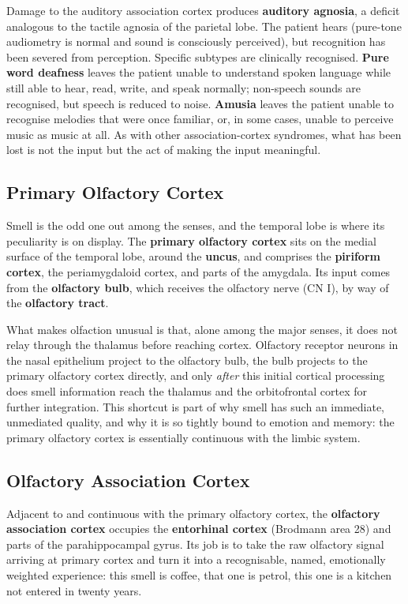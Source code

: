\documentclass[11pt]{article}
\begin{document}
Damage to the auditory association cortex produces \textbf{auditory agnosia}, a deficit analogous to the tactile agnosia of the parietal lobe. The patient hears (pure-tone audiometry is normal and sound is consciously perceived), but recognition has been severed from perception. Specific subtypes are clinically recognised. \textbf{Pure word deafness} leaves the patient unable to understand spoken language while still able to hear, read, write, and speak normally; non-speech sounds are recognised, but speech is reduced to noise. \textbf{Amusia} leaves the patient unable to recognise melodies that were once familiar, or, in some cases, unable to perceive music as music at all. As with other association-cortex syndromes, what has been lost is not the input but the act of making the input meaningful.

\subsection{Primary Olfactory Cortex}

Smell is the odd one out among the senses, and the temporal lobe is where its peculiarity is on display. The \textbf{primary olfactory cortex} sits on the medial surface of the temporal lobe, around the \textbf{uncus}, and comprises the \textbf{piriform cortex}, the periamygdaloid cortex, and parts of the amygdala. Its input comes from the \textbf{olfactory bulb}, which receives the olfactory nerve (CN I), by way of the \textbf{olfactory tract}.

What makes olfaction unusual is that, alone among the major senses, it does not relay through the thalamus before reaching cortex. Olfactory receptor neurons in the nasal epithelium project to the olfactory bulb, the bulb projects to the primary olfactory cortex directly, and only \textit{after} this initial cortical processing does smell information reach the thalamus and the orbitofrontal cortex for further integration. This shortcut is part of why smell has such an immediate, unmediated quality, and why it is so tightly bound to emotion and memory: the primary olfactory cortex is essentially continuous with the limbic system.

\subsection{Olfactory Association Cortex}

Adjacent to and continuous with the primary olfactory cortex, the \textbf{olfactory association cortex} occupies the \textbf{entorhinal cortex} (Brodmann area 28) and parts of the parahippocampal gyrus. Its job is to take the raw olfactory signal arriving at primary cortex and turn it into a recognisable, named, emotionally weighted experience: this smell is coffee, that one is petrol, this one is a kitchen not entered in twenty years.
\end{document}
